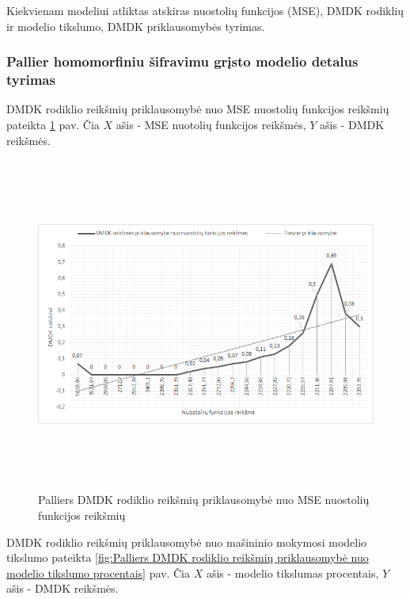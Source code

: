 \documentclass{VUMIFInfBakalaurinis}
\begin{document}
\par Kiekvienam modeliui atliktas atskiras nuostolių funkcijos (MSE), DMDK rodiklių ir modelio tikslumo, DMDK priklausomybės tyrimas.

\subsubsection{Pallier homomorfiniu šifravimu grįsto modelio detalus tyrimas}
\par DMDK rodiklio reikšmių priklausomybė nuo MSE nuostolių funkcijos reikšmių pateikta \ref{fig:Palliers DMDK rodiklio reikšmių priklausomybė nuo MSE nuostolių funkcijos reikšmių} pav. Čia $X$ ašis - MSE nuotolių funkcijos reikšmės, $Y$ ašis - DMDK reikšmės. 

\begin{figure}[h]
  \centering
  \includegraphics[width=14cm,height=11cm,keepaspectratio]{img/pal_tyr_1.png}
  \caption{Palliers DMDK rodiklio reikšmių priklausomybė nuo MSE nuostolių funkcijos reikšmių}
  \label{fig:Palliers DMDK rodiklio reikšmių priklausomybė nuo MSE nuostolių funkcijos reikšmių}
\end{figure}

\par DMDK rodiklio reikšmių priklausomybė nuo mašininio mokymosi modelio tikslumo pateikta \ref{fig:Palliers DMDK rodiklio reikšmių priklausomybė nuo modelio tikslumo procentais} pav. Čia $X$ ašis - modelio tikslumas procentais, $Y$ ašis - DMDK reikšmės.
\end{document}
